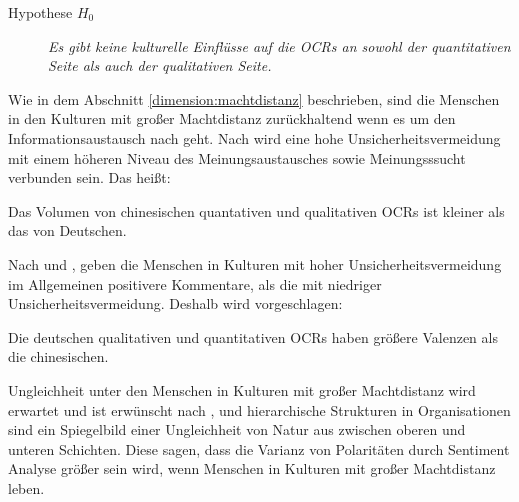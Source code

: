 \begin{description}
    \item[Hypothese $H_0$] \emph{Es gibt keine kulturelle Einflüsse auf die \acl{OCRs} an sowohl der quantitativen Seite als auch der qualitativen Seite.}
\label{hyp:0}
\end{description}

Wie in dem Abschnitt \ref{dimension:machtdistanz} beschrieben, sind die Menschen in den Kulturen mit großer Machtdistanz zurückhaltend wenn es um den Informationsaustausch nach \citet{Lam2009} geht. Nach \citet{Lam2009, liu2001relationships, dawar1996cross, money1998explorations} wird eine hohe Unsicherheitsvermeidung mit einem höheren Niveau des Meinungsaustausches sowie Meinungsssucht verbunden sein. Das heißt: %
\begin{hyp} 
Das Volumen von chinesischen quantativen und qualitativen \acl{OCRs} ist kleiner als das von Deutschen.
\label{hyp:1}
\end{hyp}

Nach \citet{liu2001relationships} und \citet{donthu1998cultural}, geben die Menschen in Kulturen mit hoher Unsicherheitsvermeidung im Allgemeinen positivere Kommentare, als die mit niedriger Unsicherheitsvermeidung. Deshalb wird vorgeschlagen:
\begin{hyp} 
Die deutschen qualitativen und quantitativen \acl{OCRs} haben größere Valenzen als die chinesischen.
\label{hyp:2}
\end{hyp}

Ungleichheit unter den Menschen in Kulturen mit großer Machtdistanz wird erwartet und ist erwünscht nach \citet{hofstede2013interkulturelle}, und hierarchische Strukturen in Organisationen sind ein Spiegelbild einer Ungleichheit von Natur aus zwischen oberen und unteren Schichten. Diese sagen, dass die Varianz von Polaritäten durch Sentiment Analyse größer sein wird, wenn Menschen in Kulturen mit großer Machtdistanz leben.


